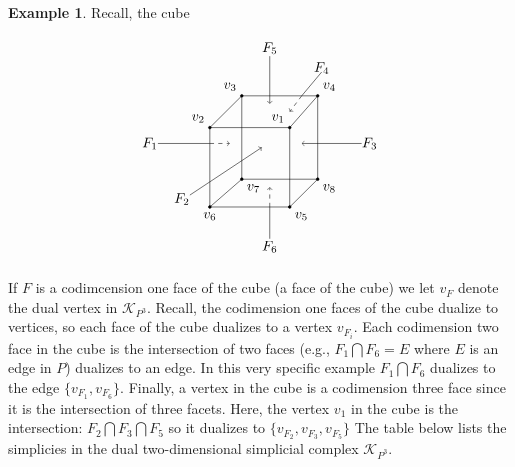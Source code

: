\documentclass[oneside,12pt]{amsart}
\theoremstyle{definition}
\newtheorem{Example}[Theorem]{Example}
\numberwithin{equation}{section}
\begin{document}
\begin{Example}

Recall, the cube


\begin{minipage}{\linewidth}%
$$
\begin{tikzpicture}
\draw (0,0)--(2,0)--(2,2)--(0,2)--(0,0);
\draw (.8,.7)--(2.7,.7)--(2.7,2.8)--(.8,2.8)--(.8,.7);
\draw (.8,.7)--(0,0);
\draw (2,0)--(2.7,.7);
\draw (2,2)--(2.7,2.8);
\draw (0,2)--(.8,2.8);
\filldraw[black] (0,0) node[below=.1pt]{$v_6$} circle (1pt);
\filldraw[black] (.8,.7) node[below right=.1pt]{$v_7$} circle (1pt);
\filldraw[black] (2,0) node[below right=.1pt]{$v_5$} circle (1pt);
\filldraw[black] (2.7,.7) node[below right=.1pt]{$v_8$}circle (1pt);
\filldraw[black] (2,2) node[above left=.1pt]{$v_1$}circle (1pt);
\filldraw[black] (0,2) node[above left=.1pt]{$v_2$} circle (1pt);
\filldraw[black] (2.7,2.8) node[above right=.1pt]{$v_4$} circle (1pt);
\filldraw[black] (.8,2.8) node[above left=.1pt]{$v_3$}circle (1pt);
\draw (1.5,4)node{$F_{5}$};
\draw[->](1.5,3.8)--(1.5,2.6);
\draw (4,1.6)node{$F_{3}$};
\draw[->](3.8,1.6)--(2.3,1.6);
\draw (-.7,.2)node{$F_{2}$};
\draw[->](-.5,.3)--(1.3,1.5);
\draw (-1.5,1.6)node{$F_{1}$};
\draw[-](-1.3,1.6)--(0,1.6);
\draw[dashed,->](0,1.6)--(.5,1.6);
\draw (1.5,-1)node{$F_{6}$};
\draw[-](1.5,-.8)--(1.5,0);
\draw[dashed,->](1.5,0)--(1.5,.5);
\draw (2.8,3.5)node{$F_{4}$};
\draw[-](2.8,3.4)--(2.3,2.8);
\draw[dashed,->](2.3,2.8)--(2,2.4);
\end{tikzpicture}$$
        \end{minipage}


If $F$ is a codimcension one face of the cube (a face of the cube) we let $v_F$ denote the dual vertex in $\mathcal{K}_{P^3}$. Recall, the codimension one faces of the cube dualize to vertices, so each face of the cube dualizes to a vertex $v_{F_i}$.  Each codimension two face in the cube is the intersection of two faces (e.g., $F_1 \bigcap F_6 = E$ where $E$ is an edge in $P$) dualizes to an edge.  In this very specific example $F_1 \bigcap F_6$ dualizes to the edge $\{v_{F_1}, v_{F_6}\}$.  Finally, a vertex in the cube is a codimension three face since it is the intersection of three facets.  Here, the vertex $v_1$ in the cube is the intersection:  $F_2 \bigcap F_3\bigcap F_5$ so it dualizes to $\{v_{F_2}, v_{F_3}, v_{F_5}\} $  The table below lists the simplicies in the dual two-dimensional simplicial complex $\mathcal{K}_{P^3}$.


\end{Example}
\end{document}
